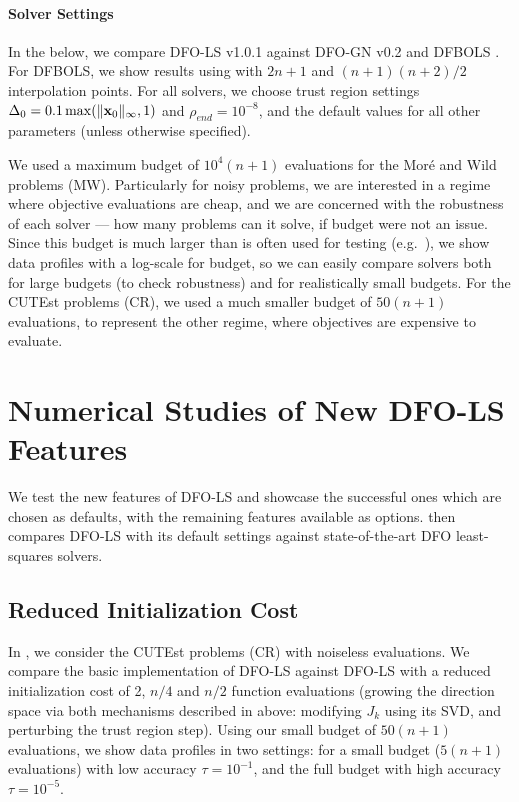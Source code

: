 \paragraph{Solver Settings}
In the below, we compare DFO-LS v1.0.1 against DFO-GN v0.2 \cite{Cartis2017a} and DFBOLS \cite{Zhang2010}.
For DFBOLS, we show results using with $2n+1$ and $(n+1)(n+2)/2$ interpolation points.
For all solvers, we choose trust region settings $\Delta_0=0.1\max(\|\mathbf{x}_0\|_{\infty}, 1)$ and $\rho_{end}=10^{-8}$, and the default values for all other parameters (unless otherwise specified).

We used a maximum budget of $10^4 (n+1)$ evaluations for the Mor\'e and Wild problems (MW).
Particularly for noisy problems, we are interested in a regime where objective evaluations are cheap, and we are concerned with the robustness of each solver --- how many problems can it solve, if budget were not an issue.
Since this budget is much larger than is often used for testing (e.g.~\cite{Zhang2010,Cartis2017a}), we show data profiles with a log-scale for budget, so we can easily compare solvers both for large budgets (to check robustness) and for realistically small budgets.
For the CUTEst problems (CR), we used a much smaller budget of $50(n+1)$ evaluations, to represent the other regime, where objectives are expensive to evaluate.

\section{Numerical Studies of New DFO-LS Features} \label{sec_new_features_results}
We test the new  features of DFO-LS 
and showcase the successful ones which are chosen as defaults, with the remaining features available as options.
 then compares DFO-LS with its default settings against state-of-the-art  DFO least-squares solvers.


\subsection{Reduced Initialization Cost} \label{sec_growing_testing}
In , we consider the CUTEst problems (CR) with noiseless evaluations.
We compare the basic implementation of DFO-LS against DFO-LS with a reduced initialization cost of 2, $n/4$ and $n/2$ function evaluations (growing the direction space via both mechanisms described in  above: modifying $J_k$ using its SVD, and perturbing the trust region step). 
Using our small budget of $50(n+1)$ evaluations, we show data profiles in two settings: for a small budget ($5(n+1)$ evaluations) with low accuracy $\tau=10^{-1}$, and the full budget with high accuracy $\tau=10^{-5}$.

